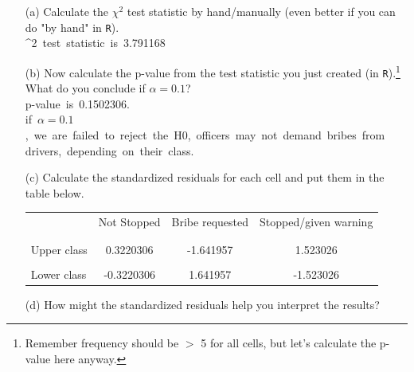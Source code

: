 \documentclass[12pt,letterpaper]{article}
\begin{document}
	\begin{enumerate}
		
		\item [(a)]
		Calculate the $\chi^2$ test statistic by hand/manually (even better if you can do "by hand" in \texttt{R}).\\
		
		\chi^2~test~statistic~is~3.791168
		
		\vspace{.25cm}
		
		\item [(b)]
		Now calculate the p-value from the test statistic you just created (in \texttt{R}).\footnote{Remember frequency should be $>$ 5 for all cells, but let's calculate the p-value here anyway.}  What do you conclude if $\alpha = 0.1$?\\
		
		p-value~is~0.1502306.\\
		if~$\alpha=0.1$,~we~are~failed~to~reject~the~H0,~officers~may~not~demand~bribes~from drivers,~depending~on~their~class.
		
		\newpage
		\item [(c)] Calculate the standardized residuals for each cell and put them in the table below.
		\vspace{1cm}
		
		\begin{table}[h]
			\centering
			\begin{tabular}{l | c c c }
				& Not Stopped & Bribe requested & Stopped/given warning \\
				\\[-1.8ex] 
				\hline \\[-1.8ex]
				Upper class & 0.3220306 & -1.641957 & 1.523026  \\
				\\
				Lower class & -0.3220306 & 1.641957 & -1.523026  \\
				
			\end{tabular}
		\end{table}
		
		
		
		\vspace{7cm}
		\item [(d)] How might the standardized residuals help you interpret the results?  
		
		
	\end{enumerate}
	\newpage
	
\end{document}
